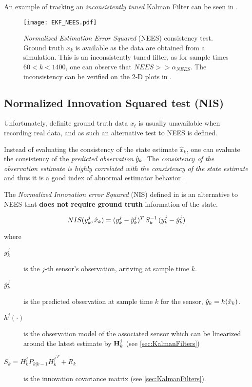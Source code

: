 An example of tracking an \emph{inconsistently tuned} Kalman Filter can be seen in .
\begin{figure}[H]
	\centering
	\texttt{[image: EKF\_NEES.pdf]}
	\caption{\emph{Normalized Estimation Error Squared} (NEES) consistency test. Ground truth $x_k$ is available as the data are obtained from a simulation. This is an inconsistently tuned filter, as for sample times $60<k<1400$, one can observe that $NEES>> \alpha_{NEES}$. The inconsistency can be verified on the 2-D plots in .}
	\label{fig:ekfnees}
\end{figure}



\subsection{Normalized Innovation Squared test (NIS)}\label{ssec:NIS}
Unfortunately, definite ground truth data $x_t$ is usually unavailable when recording real data, and as such an alternative test to NEES is defined.


Instead of evaluating the consistency of the state estimate $\hat{x}_k$, one can evaluate the consistency of the \emph{predicted observation} ${\hat{{y}}}_k$. The \emph{consistency of the observation estimate is highly correlated with the consistency of the state estimate} and thus it is a good index of abnormal estimator behavior \cite{Ivanov2014}.

The \emph{Normalized Innovation error Squared} (NIS) defined in  is an alternative to NEES that \textbf{does not require ground truth} information of the state.



\begin{framed}
	
\begin{equation}\label{eq:NIS}
NIS({y}^j_k,\hat{x}_k) = ({{y}}^j_k - {{\hat{{y}}}}^j_k)^T \, S_k^{-1} \, ({{y}}^j_k - {{\hat{{y}}}}^j_k)
\end{equation}

where

\begin{description}
	\item[$ {y}^j_k $] is the $j$-th sensor's observation, arriving at sample time $k$.
	\item[$ {\hat{{y}}}^j_k $] is the predicted observation at sample time $k$ for the  sensor, \ie $ {\hat{{y}}}_k =  h(\hat{x}_k)$.
	\item[$h^j(\cdot)$] is the observation model of the associated sensor which can be linearized around the latest estimate by $\mathbf{H}^j_k$ (see \cref{sec:KalmanFilters})
	\item[$S_k = H^j_k P_{k|k-1} {H^j_k}^T + R_k$] is the innovation covariance matrix (see \cref{sec:KalmanFilters}).
\end{description}
\end{framed}

